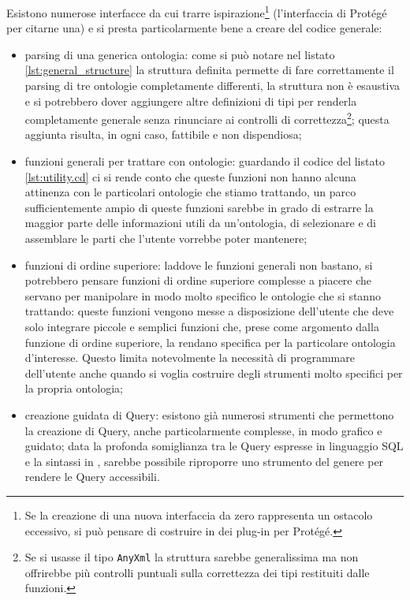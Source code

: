 Esistono numerose interfacce da cui trarre ispirazione\footnote{Se la creazione di una nuova interfaccia da zero rappresenta un ostacolo eccessivo, si può pensare di costruire in \cduce dei plug-in per Protégé.} (l'interfaccia di Protégé per citarne una) e \cduce si presta particolarmente bene a creare del codice generale:
\begin{itemize}
	\item parsing di una generica ontologia: come si può notare nel listato \ref{lst:general_structure} la struttura definita permette di fare correttamente il parsing di tre ontologie completamente differenti, la struttura non è esaustiva e si potrebbero dover aggiungere altre definizioni di tipi per renderla completamente generale senza rinunciare ai controlli di correttezza\footnote{Se si usasse il tipo \texttt{AnyXml} la struttura sarebbe generalissima ma non offrirebbe più controlli puntuali sulla correttezza dei tipi restituiti dalle funzioni.}; questa aggiunta risulta, in ogni caso, fattibile e non dispendiosa;
	\item funzioni generali per trattare con ontologie: guardando il codice del listato \ref{lst:utility.cd} ci si rende conto che queste funzioni non hanno alcuna attinenza con le particolari ontologie che stiamo trattando, un parco sufficientemente ampio di queste funzioni sarebbe in grado di estrarre la maggior parte delle informazioni utili da un'ontologia, di selezionare e di assemblare le parti che l'utente vorrebbe poter mantenere;
	\item\label{ch5.4_func}funzioni di ordine superiore: laddove le funzioni generali non bastano, si potrebbero pensare funzioni di ordine superiore complesse a piacere che servano per manipolare in modo molto specifico le ontologie che si stanno trattando: queste funzioni vengono messe a disposizione dell'utente che deve solo integrare piccole e semplici funzioni che, prese come argomento dalla funzione di ordine superiore, la rendano specifica per la particolare ontologia d'interesse. Questo limita notevolmente la necessità di programmare dell'utente anche quando si voglia costruire degli strumenti molto specifici per la propria ontologia;
	\item creazione guidata di Query: esistono già numerosi strumenti che permettono la creazione di Query, anche particolarmente complesse, in modo grafico e guidato; data la profonda somiglianza tra le Query espresse in linguaggio SQL e la sintassi in \cduce, sarebbe possibile riproporre uno strumento del genere per rendere le Query accessibili.	
\end{itemize}
